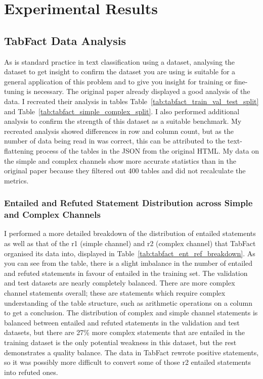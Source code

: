 \chapter{Experimental Results}

\section{TabFact Data Analysis}

As is standard practice in text classification using a dataset, analysing the dataset to get insight to confirm the dataset you are using is suitable for a general application of this problem and to give you insight for training or fine-tuning is necessary. The original paper already displayed a good analysis of the data. I recreated their analysis in tables Table~\ref{tab:tabfact_train_val_test_split} and Table~\ref{tab:tabfact_simple_complex_split}. I also performed additional analysis to confirm the strength of this dataset as a suitable benchmark. My recreated analysis showed differences in row and column count, but as the number of data being read in was correct, this can be attributed to the text-flattening process of the tables in the JSON from the original HTML. My data on the simple and complex channels show more accurate statistics than in the original paper because they filtered out 400 tables and did not recalculate the metrics. 



\subsection{Entailed and Refuted Statement Distribution across Simple and Complex Channels}
I performed a more detailed breakdown of the distribution of entailed statements as well as that of the r1 (simple channel) and r2 (complex channel) that TabFact organised its data into, displayed in Table~\ref{tab:tabfact_ent_ref_breakdown}. As you can see from the table, there is a slight imbalance in the number of entailed and refuted statements in favour of entailed in the training set. The validation and test datasets are nearly completely balanced. There are more complex channel statements overall; these are statements which require complex understanding of the table structure, such as arithmetic operations on a column to get a conclusion. The distribution of complex and simple channel statements is balanced between entailed and refuted statements in the validation and test datasets, but there are 27\% more complex statements that are entailed in the training dataset is the only potential weakness in this dataset, but the rest demonstrates a quality balance. The data in TabFact rewrote positive statements, so it was possibly more difficult to convert some of those r2 entailed statements into refuted ones. 


